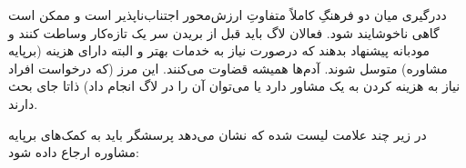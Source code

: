 ددرگیری میان دو فرهنگِ کاملاً متفاوتِ ارزش‌محور اجتناب‌ناپذیر است
و ممکن است گاهی ناخوشایند شود.
فعالان لاگ باید قبل از بریدن سر یک تازه‌کار وساطت کنند
و مودبانه پیشنهاد بدهند که درصورت نیاز به خدمات بهتر
و البته دارای هزینه (برپایه مشاوره) متوسل شوند.
آدم‌ها همیشه قضاوت می‌کنند. این مرز (که درخواست افراد
نیاز به هزینه کردن به یک مشاور دارد یا می‌توان آن را در
لاگ انجام داد) ذاتا جای بحث دارند.

در زیر چند علامت لیست شده که نشان می‌دهد پرسشگر باید به
کمک‌های برپایه مشاوره ارجاع داده شود:

